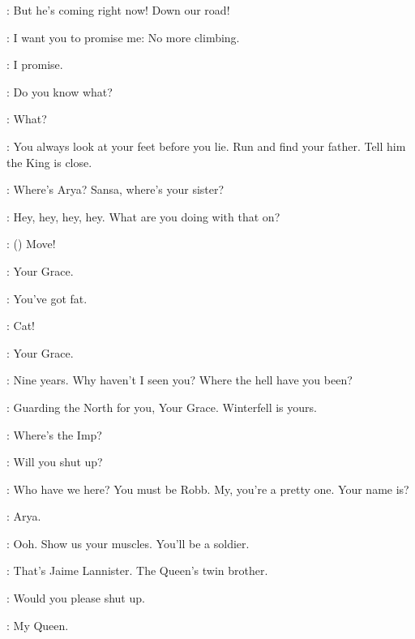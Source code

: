 \BRAN: But he's coming right now! Down our road! 

\CATELYN: I want you to promise me: No more climbing. 

\BRAN:  I promise. 

\CATELYN: Do you know what? 

\BRAN: What? 

\CATELYN: You always look at your feet before you lie. Run and find your father. Tell him the King is close. 


\CATELYN: Where's Arya? Sansa, where's your sister? 


\NED: Hey, hey, hey, hey. What are you doing with that on?  

\ARYA: () Move! 


\NED: Your Grace. 

\ROBERT: You've got fat. 


\ROBERT: Cat! 

\CATELYN: Your Grace. 

\ROBERT: Nine years. Why haven't I seen you? Where the hell have you been? 

\NED: Guarding the North for you, Your Grace. Winterfell is yours. 

\ARYA: Where's the Imp? 

\SANSA: Will you shut up? 

\ROBERT: Who have we here? You must be Robb.  My, you're a pretty one.  Your name is? 

\ARYA: Arya. 

\ROBERT:   Ooh. Show us your muscles. You'll be a soldier. 


\ARYA: That's Jaime Lannister. The Queen's twin brother. 

\SANSA: Would you please shut up. 


\NED: My Queen. 

